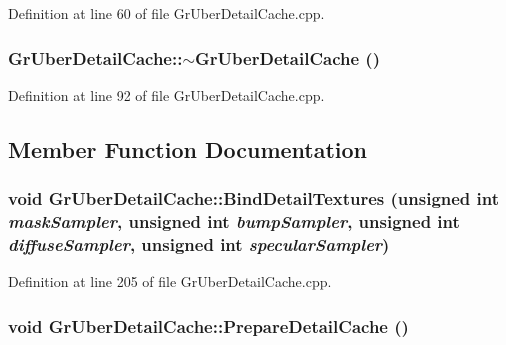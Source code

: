 Definition at line 60 of file GrUberDetailCache.cpp.\hypertarget{class_gr_uber_detail_cache_cc67d35e05435f6a2472025b82022196}{
\subsubsection[{$\sim$GrUberDetailCache}]{\setlength{\rightskip}{0pt plus 5cm}GrUberDetailCache::$\sim$GrUberDetailCache ()}}
\label{class_gr_uber_detail_cache_cc67d35e05435f6a2472025b82022196}




Definition at line 92 of file GrUberDetailCache.cpp.

\subsection{Member Function Documentation}
\hypertarget{class_gr_uber_detail_cache_09b761a56435b280523c0e0ce601bbe2}{
\subsubsection[{BindDetailTextures}]{\setlength{\rightskip}{0pt plus 5cm}void GrUberDetailCache::BindDetailTextures (unsigned int {\em maskSampler}, \/  unsigned int {\em bumpSampler}, \/  unsigned int {\em diffuseSampler}, \/  unsigned int {\em specularSampler})}}
\label{class_gr_uber_detail_cache_09b761a56435b280523c0e0ce601bbe2}




Definition at line 205 of file GrUberDetailCache.cpp.\hypertarget{class_gr_uber_detail_cache_8c57ef3013e8de891cc64d633f033a26}{
\subsubsection[{PrepareDetailCache}]{\setlength{\rightskip}{0pt plus 5cm}void GrUberDetailCache::PrepareDetailCache ()}}
\label{class_gr_uber_detail_cache_8c57ef3013e8de891cc64d633f033a26}




